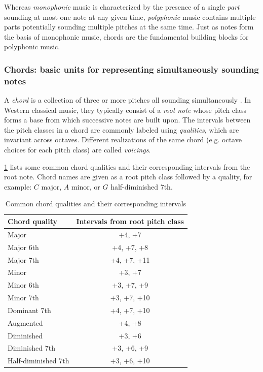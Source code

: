Whereas \emph{monophonic} music is characterized by the presence of a single
\emph{part} sounding at most one note at any given time, \emph{polyphonic}
music contains multiple parts potentially sounding multiple pitches at the same
time. Just as notes form the basis of monophonic music, chords are the fundamental
building blocks for polyphonic music.

\subsubsection{Chords: basic units for representing simultaneously sounding notes}

A \emph{chord} is a collection of three or more pitches all sounding
simultaneously \citep{randel1999harvard}. In Western classical music, they
typically consist of a \emph{root note} whose pitch class forms a base from
which successive notes are built upon. The intervals between the pitch classes
in a chord are commonly labeled using \emph{qualities}, which are invariant
across octaves. Different realizations of the same chord (e.g. octave choices
for each pitch class) are called \emph{voicings}.

\cref{tab:chord-qualities} lists some common chord qualities and their
corresponding intervals from the root note. Chord names are given as a root
pitch class followed by a quality, for example: $C$ major, $A$ minor, or $G$
half-diminished $7$th.

\begin{table}[htpb]
    \centering
    \begin{tabular}{lc}
        \toprule
        Chord quality & Intervals from root pitch class \\
        \midrule
        Major & +4, +7 \\
        Major 6th & +4, +7, +8 \\
        Major 7th & +4, +7, +11 \\
        Minor & +3, +7 \\
        Minor 6th & +3, +7, +9 \\
        Minor 7th & +3, +7, +10 \\
        Dominant 7th & +4, +7, +10 \\
        Augmented & +4, +8 \\
        Diminished & +3, +6 \\
        Diminished 7th & +3, +6, +9 \\
        Half-diminished 7th & +3, +6, +10 \\
        \bottomrule
    \end{tabular}
    \caption{Common chord qualities and their corresponding intervals \citep{freedman2015correlational}}
    \label{tab:chord-qualities}
\end{table}

